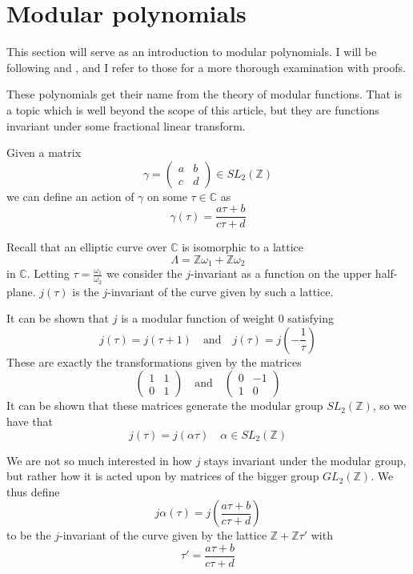 \section{Modular polynomials}
This section will serve as an introduction to modular polynomials.
I will be following \cite{Lang2} and \cite{Adv}, and I refer to those for a more thorough examination
with proofs.

These polynomials get their name from the theory of modular functions. That is a topic which is
well beyond the scope of this article, but they are functions invariant under some fractional linear
transform. 

Given a matrix
$$ \gamma = \begin{pmatrix}
 a & b \\ c & d
\end{pmatrix} \in SL_2(\mathbb{Z})$$
we can define an action of $\gamma$ on some $\tau \in \mathbb{C}$ as
$$\gamma(\tau) = \frac{a\tau + b}{c\tau + d} $$

Recall that an elliptic curve over $\mathbb{C}$ is isomorphic to a lattice
$$\Lambda = \mathbb{Z}\omega_1 + \mathbb{Z}\omega_2$$ in $\mathbb{C}$.
Letting $\tau = \frac{\omega_1}{\omega_2}$ we consider the $j$-invariant as a function
on the upper half-plane. $j(\tau)$ is the $j$-invariant of the curve given by such a lattice.

It can be shown that $j$ is a modular function of weight $0$ satisfying
$$ j(\tau) = j(\tau + 1) \quad \text{and} \quad j(\tau) = j(-\frac{1}{\tau}) $$
These are exactly the transformations given by the matrices
$$ \begin{pmatrix} 1 & 1 \\ 0 & 1 \end{pmatrix} \quad \text{and} \quad
   \begin{pmatrix} 0 & -1 \\ 1 & 0 \end{pmatrix} $$
It can be shown that these matrices generate the modular group $SL_2(\mathbb{Z})$,
so we have that
$$j(\tau) = j(\alpha \tau) \quad \alpha \in SL_2(\mathbb{Z}) $$

We are not so much interested in how $j$ stays invariant under the modular group,
but rather how it is acted upon by matrices of the bigger group $GL_2(\mathbb{Z})$.
We thus define
$$ j \alpha(\tau) = j\left(\frac{a\tau + b}{c\tau + d}\right) $$
to be the $j$-invariant of the curve given by the lattice $\mathbb{Z}+\mathbb{Z}\tau'$
with $$\tau' = \frac{a\tau + b}{c\tau + d}$$

